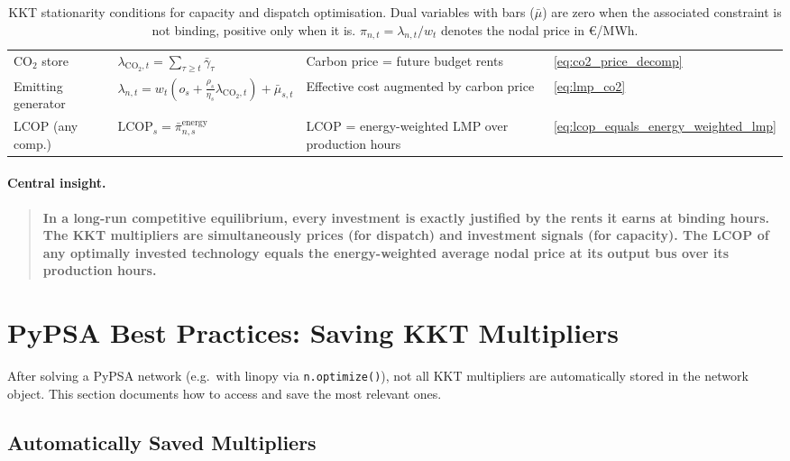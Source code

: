\documentclass{article}
\begin{document}
\begin{table}[h!]
\begin{tabular}{p{2.8cm}p{6.0cm}p{3.8cm}l}
CO$_2$ store &
    $\lambda_{\text{CO}_2,t} = \sum_{\tau \ge t} \bar{\gamma}_\tau$ &
    Carbon price = future budget rents &
    \eqref{eq:co2_price_decomp} \\
Emitting generator &
    $\lambda_{n,t} = w_t(o_s + \tfrac{\rho_s}{\eta_s} \lambda_{\text{CO}_2,t}) + \bar{\mu}_{s,t}$ &
    Effective cost augmented by carbon price &
    \eqref{eq:lmp_co2} \\
LCOP (any comp.) &
    $\mathrm{LCOP}_s = \bar{\pi}^{\text{energy}}_{n,s}$ &
    LCOP = energy-weighted LMP over production hours &
    \eqref{eq:lcop_equals_energy_weighted_lmp} \\
\hline
\end{tabular}
\caption{KKT stationarity conditions for capacity and dispatch optimisation.
Dual variables with bars ($\bar{\mu}$) are zero when the associated constraint
is not binding, positive only when it is.
$\pi_{n,t} = \lambda_{n,t}/w_t$ denotes the nodal price in \euro/MWh.}
\end{table}

\paragraph{Central insight.}
\begin{quote}
\textbf{In a long-run competitive equilibrium, every investment is exactly justified
by the rents it earns at binding hours.
The KKT multipliers are simultaneously prices (for dispatch) and investment signals
(for capacity). The LCOP of any optimally invested technology equals the
energy-weighted average nodal price at its output bus over its production hours.}
\end{quote}

\section{PyPSA Best Practices: Saving KKT Multipliers}
\label{sec:pypsa_practice}

After solving a PyPSA network (e.g.\ with linopy via \texttt{n.optimize()}),
not all KKT multipliers are automatically stored in the network object.
This section documents how to access and save the most relevant ones.

\subsection{Automatically Saved Multipliers}
\end{document}
